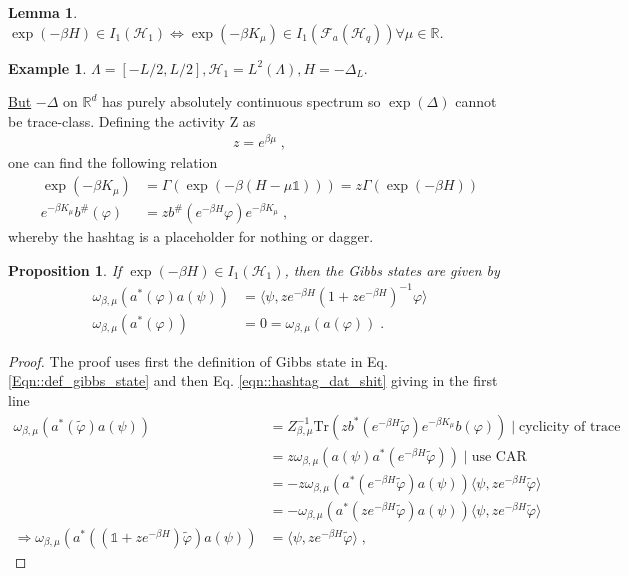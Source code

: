 \documentclass[
a4paper, %
11pt, %
onecolumn, %
openany, %
]{memoir}
\theoremstyle{definition}
\newtheorem{example}{Example}[chapter]
\theoremstyle{remark}
\theoremstyle{plain}
\newtheorem{prop}{Proposition}[chapter]
\newtheorem{lemma}{Lemma}[chapter]
\begin{document}
\begin{lemma}
	$\exp(-\beta H)\in I_1(\mathcal{H}_1)\Leftrightarrow \exp(-\beta K_{\mu})\in I_1(\mathcal{F}_a(\mathcal{H}_q))\forall\mu\in \mathbb{R}$.
\end{lemma}
\begin{example}
	$\Lambda=[-L/2,L/2], \mathcal{H}_1=L^2(\Lambda), H=-\Delta_L$.

\underline{But} $-\Delta$ on $\mathbb{R}^d$ has purely absolutely continuous spectrum so $\exp(\Delta)$ cannot be trace-class. Defining the activity Z as \begin{align}
z=e^{\beta\mu}\; ,
\end{align}
one can find the following relation \begin{align}
\exp(-\beta K_{\mu})&=\Gamma(\exp(-\beta(H-\mu\mathds{1})))=z\Gamma(\exp(-\beta H))\\
e^{-\beta K_{\mu}}b^{\#}(\varphi)&=zb^{\#}(e^{-\beta H}\varphi)e^{-\beta K_{\mu}}\label{eqn::hashtag_dat_shit}\; ,
\end{align}
whereby the hashtag is a placeholder for nothing or dagger.
\begin{prop}
	If $\exp(-\beta H)\in I_1(\mathcal{H}_1)$, then the Gibbs states are given by\begin{align}
	\omega_{\beta,\mu}(a^{*}(\varphi)a(\psi))&=\langle \psi, ze^{-\beta H}(1+ze^{-\beta H})^{-1}\varphi\rangle\\
	\omega_{\beta,\mu}(a^*(\varphi))&=0=\omega_{\beta,\mu}(a(\varphi))\; .
	\end{align}
\end{prop}
\begin{proof}
	The proof uses first the definition of Gibbs state in Eq. \eqref{Eqn::def_gibbs_state} and then Eq. \eqref{eqn::hashtag_dat_shit} giving in the first line\begin{align}
	\omega_{\beta,\mu}(a^{*}(\tilde{\varphi})a(\psi))&=Z^{-1}_{\beta,\mu}\mathrm{Tr}(zb^*(e^{-\beta H}\tilde{\varphi})e^{-\beta K_{\mu}}b(\varphi)) \mid \text{cyclicity of trace}\\
	&=z\omega_{\beta,\mu}(a(\psi)a^*(e^{-\beta H}\tilde{\varphi})) \mid \text{use CAR}\\
	&=-z\omega_{\beta,\mu}(a^*(e^{-\beta H}\tilde{\varphi})a(\psi))\langle \psi, ze^{-\beta H}\tilde{\varphi}\rangle\\
	&=-\omega_{\beta,\mu}(a^*(ze^{-\beta H}\tilde{\varphi})a(\psi))\langle \psi, ze^{-\beta H}\tilde{\varphi}\rangle\\
	\Rightarrow \omega_{\beta,\mu}(a^*((\mathds{1}+ze^{-\beta H})\tilde{\varphi})a(\psi))&=\langle \psi, ze^{-\beta H} \tilde{\varphi}\rangle\; ,

\end{align}
\end{proof}
\end{example}
\end{document}
